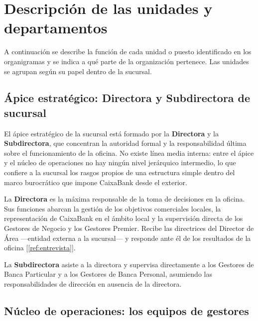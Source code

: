 \section{Descripción de las unidades y departamentos}

A continuación se describe la función de cada unidad o puesto identificado en los
organigramas y se indica a qué parte de la organización pertenece. Las unidades se
agrupan según su papel dentro de la sucursal.

\subsection{Ápice estratégico: Directora y Subdirectora de sucursal}

El ápice estratégico de la sucursal está formado por la \textbf{Directora} y la
\textbf{Subdirectora}, que concentran la autoridad formal y la responsabilidad última
sobre el funcionamiento de la oficina. No existe línea media interna: entre el ápice
y el núcleo de operaciones no hay ningún nivel jerárquico intermedio, lo que confiere
a la sucursal los rasgos propios de una estructura simple dentro del marco burocrático
que impone CaixaBank desde el exterior.

La \textbf{Directora} es la máxima responsable de la toma de decisiones en la oficina.
Sus funciones abarcan la gestión de los objetivos comerciales locales, la representación
de CaixaBank en el ámbito local y la supervisión directa de los Gestores de Negocio y
los Gestores Premier. Recibe las directrices del Director de Área ---entidad externa a
la sucursal--- y responde ante él de los resultados de la oficina [\ref{ref:entrevista}].

La \textbf{Subdirectora} asiste a la directora y supervisa directamente a los Gestores
de Banca Particular y a los Gestores de Banca Personal, asumiendo las responsabilidades
de dirección en ausencia de la directora.

\subsection{Núcleo de operaciones: los equipos de gestores}

